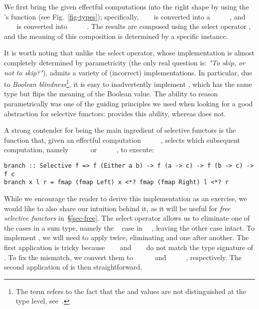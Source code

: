 \noindent
We first bring the given effectful computations into the right shape by using
the 's function  (see
Fig.~\ref{fig-types}); specifically, ~\hs{::}~~ is
converted into a ~\hs{::}~~~\hs{()}~\hs{())}, and
~\hs{::}~~\hs{()} is converted into
~\hs{::}~~\hs{(()}~\hs{->}~\hs{())}. The results are composed
using the select operator , and the meaning of this composition is
determined by a specific  instance.

It is worth noting that unlike the select operator, whose implementation is
almost completely determined by parametricity (the only real question is:
\emph{"To skip, or not to skip?"}),  admits a variety of (incorrect)
implementations. In particular, due to \emph{Boolean blindness}\footnote{The
term refers to the fact that the  and  values are not
distinguished at the type level, see~\citet{boolean-blindness}.},
it is easy to inadvertently implement , which has the same type but
flips the meaning of the Boolean value. The ability to reason parametrically was
one of the guiding principles we used when looking for a good abstraction for
selective functors:  provides this ability, whereas  does
not.

A strong contender for being the main ingredient of selective functors is the
function  that, given an effectful computation
~\hs{::}~~~~, selects which subsequent
computation, namely ~\hs{::}~~\hs{(}~\hs{->}~ or
~\hs{::}~~\hs{(}~\hs{->}~, to execute:

\vspace{1mm}
\begin{verbatim}
branch :: Selective f => f (Either a b) -> f (a -> c) -> f (b -> c) -> f c
branch x l r = fmap (fmap Left) x <*? fmap (fmap Right) l <*? r
\end{verbatim}
\vspace{1mm}

\noindent
While we encourage the reader to derive this implementation as an exercise, we
would like to also share our intuition behind it, as it will be useful for
\emph{free selective functors} in~\S\ref{sec-free}.
The select operator allows us to eliminate one of the cases in a sum type,
namely the ~ case in ~~, leaving the other
case intact. To implement , we will need to apply  twice,
eliminating  and  one after another. The first application is tricky
because ~~~ and
~\hs{(}~\hs{->}~ do not match the type signature of .
To fix the mismatch, we convert them to
~~~\hs{(}~~ and
~\hs{(}~\hs{->}~~~, respectively. The second
application of  is then straightforward.

